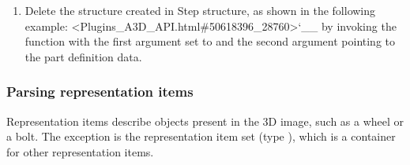 \documentclass[letterpaper,12pt,english,openany,oneside]{sphinxmanual}
\begin{document}
\begin{sphinxVerbatim}[commandchars=\\\{\}]
        
  \PYG{p}{[}\PYG{p}{]} 
\end{sphinxVerbatim}
\begin{enumerate}
%
\item {} 
Delete the  structure created in Step  structure, as shown in the following example: <Plugins\_A3D\_API.html\#50618396\_28760>`\_\_ by invoking the  function with the first argument set to  and the second argument pointing to the part definition data.

\end{enumerate}

\begin{sphinxVerbatim}[commandchars=\\\{\}]
 
\end{sphinxVerbatim}


\subsubsection{Parsing representation items}
\label{\detokenize{Plugins_A3D_API:parsing-representation-items}}
Representation items describe objects present in the 3D image, such as a wheel or a bolt. The exception is the representation item set (type  ), which is a container for other representation items.
\end{document}
